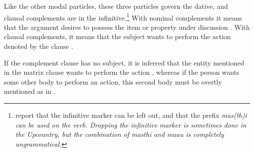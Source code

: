 

Like the other modal particles, these three particles govern the dative, and clausal complements are in the infinitive.\footnote{\citet[172f]{SmithEtAl2006cll} report that the infinitive marker can be left out, and that the  prefix \em mas(th)i \em can be used on the verb. Dropping the infinitive marker is sometimes done in the Upcountry, but the combination of \em masthi \em and \em maau \em is completely ungrammatical.}
With nominal complements it means that the argument desires to possess the item or property under discussion . With clausal complements, it means that the subject wants to perform the action denoted by the clause .





 If the complement clause has no subject, it is inferred that the entity mentioned in the  matrix clause wants to perform the action  , whereas if the person wants some other body to perform an action, this second body must be overtly mentioned as in .




